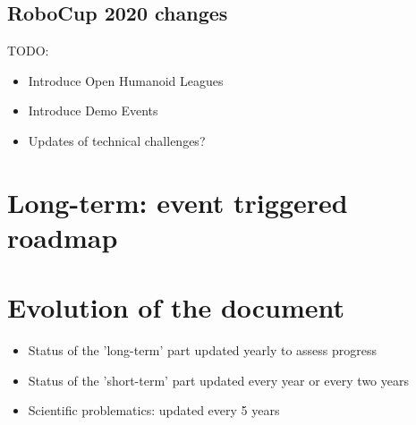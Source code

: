 \documentclass{article}
\begin{document}
\subsection{RoboCup 2020 changes}

TODO: 
\begin{itemize}
\item Introduce Open Humanoid Leagues
\item Introduce Demo Events
\item Updates of technical challenges?
\end{itemize}


\section{\label{sec:LongTerm}Long-term: event triggered roadmap}



\begin{sidewaysfigure}

\end{sidewaysfigure}


\section{Evolution of the document}

\begin{itemize}
\item Status of the 'long-term' part updated yearly to assess progress
\item Status of the 'short-term' part updated every year or every two years
\item Scientific problematics: updated every 5 years
\end{itemize}


\newpage

\printbibliography
\end{document}
